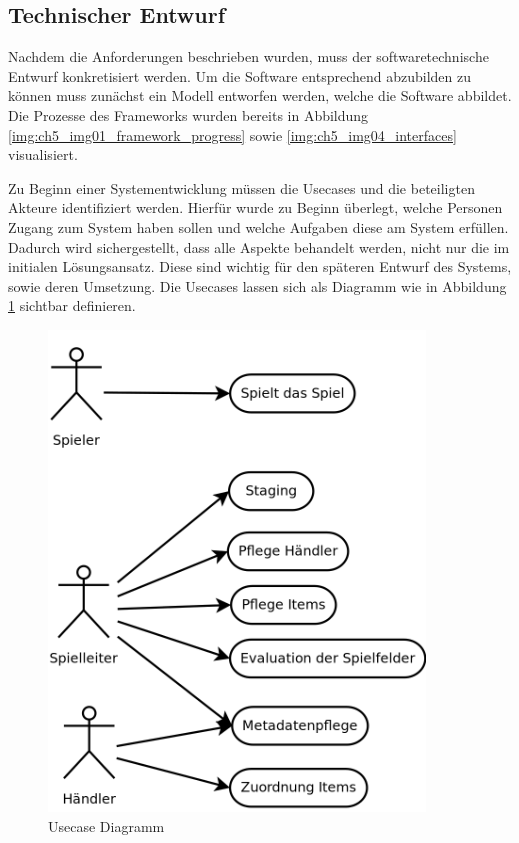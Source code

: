 

\subsection*{Technischer Entwurf}

Nachdem die Anforderungen beschrieben wurden, muss der softwaretechnische Entwurf konkretisiert werden.
Um die Software entsprechend abzubilden zu können muss zunächst ein Modell entworfen werden, welche die Software abbildet. Die Prozesse des Frameworks wurden bereits in Abbildung \ref{img:ch5_img01_framework_progress} sowie \ref{img:ch5_img04_interfaces} visualisiert.

Zu Beginn einer Systementwicklung müssen die Usecases und die beteiligten Akteure identifiziert werden.
Hierfür wurde zu Beginn überlegt, welche Personen Zugang zum System haben sollen und welche Aufgaben diese am System erfüllen.
Dadurch wird sichergestellt, dass alle Aspekte behandelt werden, nicht nur die im initialen Lösungsansatz. Diese sind wichtig für den späteren Entwurf des Systems, sowie deren Umsetzung.
Die Usecases lassen sich als Diagramm wie in Abbildung \ref{img:ch5_img06_usecases} sichtbar definieren.



\begin{figure}[H]
\begin{center}
\includegraphics[width=100mm]{images/ch5_img06_usecases.png}
\caption{Usecase Diagramm}
\label{img:ch5_img06_usecases}
\end{center}
\end{figure}


